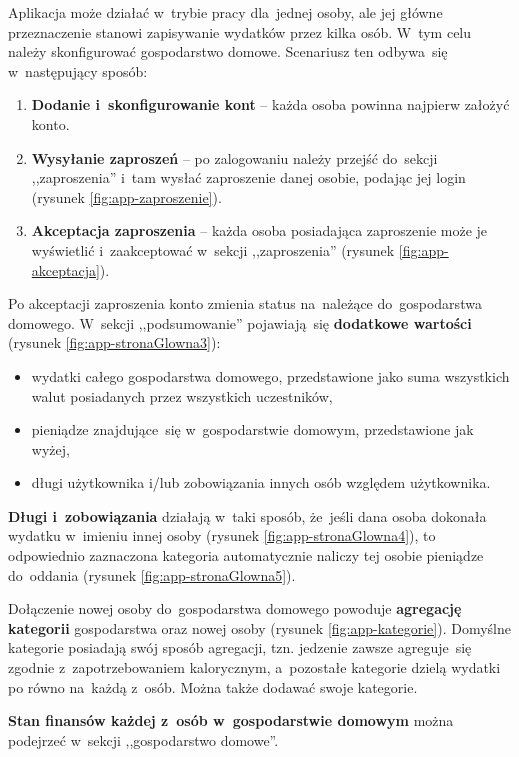 \documentclass[12pt,a4paper,twoside,titlepage,openright]{book}
\begin{document}
Aplikacja może działać w~trybie pracy dla~jednej osoby, ale jej główne przeznaczenie stanowi zapisywanie wydatków przez kilka osób. W~tym celu należy skonfigurować gospodarstwo domowe. Scenariusz ten odbywa~się w~następujący sposób:

\begin{enumerate}
\item \textbf{Dodanie i~skonfigurowanie kont} -- każda osoba powinna najpierw założyć konto.
\item \textbf{Wysyłanie zaproszeń} -- po zalogowaniu należy przejść do~sekcji ,,zaproszenia'' i~tam wysłać zaproszenie danej osobie, podając jej login (rysunek \ref{fig:app-zaproszenie}).
\item \textbf{Akceptacja zaproszenia} -- każda osoba posiadająca zaproszenie może je wyświetlić i~zaakceptować w~sekcji ,,zaproszenia'' (rysunek \ref{fig:app-akceptacja}).  
\end{enumerate}

Po akceptacji zaproszenia konto zmienia status na~należące do~gospodarstwa domowego. W~sekcji ,,podsumowanie'' pojawiają~się \textbf{dodatkowe wartości} (rysunek \ref{fig:app-stronaGlowna3}):

\begin{itemize}
\item wydatki całego gospodarstwa domowego, przedstawione jako suma wszystkich walut posiadanych przez wszystkich uczestników,
\item pieniądze znajdujące~się w~gospodarstwie domowym, przedstawione jak wyżej,
\item długi użytkownika i/lub zobowiązania innych osób względem użytkownika.
\end{itemize}

\textbf{Długi i~zobowiązania} działają w~taki sposób, że~jeśli dana osoba dokonała wydatku w~imieniu innej osoby (rysunek \ref{fig:app-stronaGlowna4}), to odpowiednio zaznaczona kategoria automatycznie naliczy tej osobie pieniądze do~oddania (rysunek \ref{fig:app-stronaGlowna5}).

Dołączenie nowej osoby do~gospodarstwa domowego powoduje \textbf{agregację kategorii} gospodarstwa oraz nowej osoby (rysunek \ref{fig:app-kategorie}). Domyślne kategorie posiadają swój sposób agregacji, tzn. jedzenie zawsze agreguje~się zgodnie z~zapotrzebowaniem kalorycznym, a~pozostałe kategorie dzielą wydatki po równo na~każdą z~osób. Można także dodawać swoje kategorie.

\textbf{Stan finansów każdej z~osób w~gospodarstwie domowym} można podejrzeć w~sekcji ,,gospodarstwo domowe''. %
\end{document}
